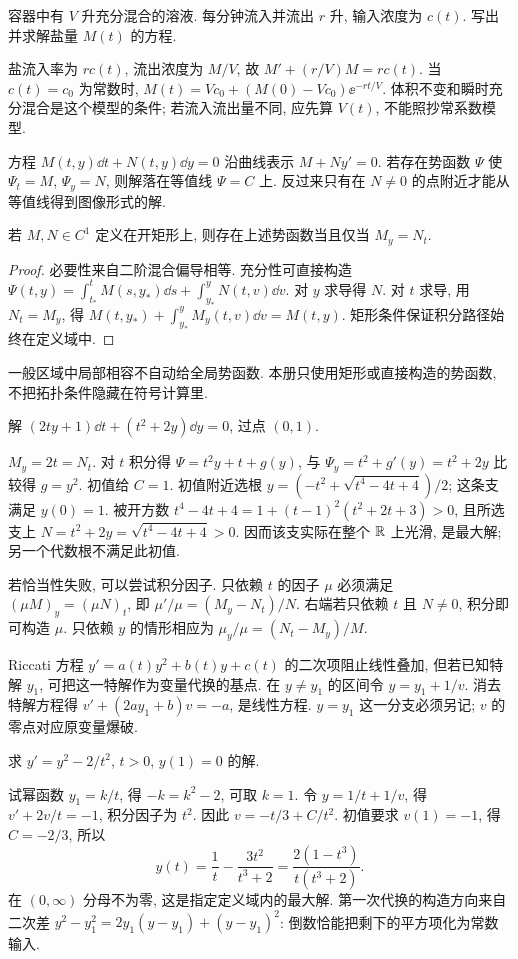 \begin{example}
容器中有 $V$ 升充分混合的溶液. 每分钟流入并流出 $r$ 升, 输入浓度为 $c(t)$. 写出并求解盐量 $M(t)$ 的方程.
\end{example}
\begin{solution}
盐流入率为 $rc(t)$, 流出浓度为 $M/V$, 故 $M'+(r/V)M=rc(t)$. 当 $c(t)=c_0$ 为常数时, $M(t)=Vc_0+(M(0)-Vc_0)\ee^{-rt/V}$. 体积不变和瞬时充分混合是这个模型的条件; 若流入流出量不同, 应先算 $V(t)$, 不能照抄常系数模型.
\end{solution}
方程 $M(t,y)\dd t+N(t,y)\dd y=0$ 沿曲线表示 $M+Ny'=0$. 若存在势函数 $\Psi$ 使 $\Psi_t=M$, $\Psi_y=N$, 则解落在等值线 $\Psi=C$ 上. 反过来只有在 $N\ne0$ 的点附近才能从等值线得到图像形式的解.
\begin{proposition}
若 $M,N\in C^1$ 定义在开矩形上, 则存在上述势函数当且仅当 $M_y=N_t$.
\end{proposition}
\begin{proof}
必要性来自二阶混合偏导相等. 充分性可直接构造
$\Psi(t,y)=\int_{t_*}^{t}M(s,y_*)\dd s+\int_{y_*}^{y}N(t,v)\dd v$.
对 $y$ 求导得 $N$. 对 $t$ 求导, 用 $N_t=M_y$, 得 $M(t,y_*)+\int_{y_*}^{y}M_y(t,v)\dd v=M(t,y)$. 矩形条件保证积分路径始终在定义域中.
\end{proof}
一般区域中局部相容不自动给全局势函数. 本册只使用矩形或直接构造的势函数, 不把拓扑条件隐藏在符号计算里.
\begin{example}解 $(2ty+1)\dd t+(t^2+2y)\dd y=0$, 过点 $(0,1)$.\end{example}
\begin{solution}
$M_y=2t=N_t$. 对 $t$ 积分得 $\Psi=t^2y+t+g(y)$, 与 $\Psi_y=t^2+g'(y)=t^2+2y$ 比较得 $g=y^2$. 初值给 $C=1$. 初值附近选根
$y=(-t^2+\sqrt{t^4-4t+4})/2$; 这条支满足 $y(0)=1$. 被开方数 $t^4-4t+4=1+(t-1)^2(t^2+2t+3)>0$, 且所选支上 $N=t^2+2y=\sqrt{t^4-4t+4}>0$. 因而该支实际在整个 $\mathbb R$ 上光滑, 是最大解; 另一个代数根不满足此初值.
\end{solution}
若恰当性失败, 可以尝试积分因子. 只依赖 $t$ 的因子 $\mu$ 必须满足 $(\mu M)_y=(\mu N)_t$, 即 $\mu'/\mu=(M_y-N_t)/N$. 右端若只依赖 $t$ 且 $N\ne0$, 积分即可构造 $\mu$. 只依赖 $y$ 的情形相应为 $\mu_y/\mu=(N_t-M_y)/M$.

Riccati 方程 $y'=a(t)y^2+b(t)y+c(t)$ 的二次项阻止线性叠加, 但若已知特解 $y_1$, 可把这一特解作为变量代换的基点. 在 $y\ne y_1$ 的区间令 $y=y_1+1/v$. 消去特解方程得 $v'+(2ay_1+b)v=-a$, 是线性方程. $y=y_1$ 这一分支必须另记; $v$ 的零点对应原变量爆破.
\begin{example}求 $y'=y^2-2/t^2$, $t>0$, $y(1)=0$ 的解.\end{example}
\begin{solution}
试幂函数 $y_1=k/t$, 得 $-k=k^2-2$, 可取 $k=1$. 令 $y=1/t+1/v$, 得 $v'+2v/t=-1$, 积分因子为 $t^2$. 因此 $v=-t/3+C/t^2$. 初值要求 $v(1)=-1$, 得 $C=-2/3$, 所以
\[
y(t)=\frac1t-\frac{3t^2}{t^3+2}=\frac{2(1-t^3)}{t(t^3+2)}.
\]
在 $(0,\infty)$ 分母不为零, 这是指定定义域内的最大解. 第一次代换的构造方向来自二次差 $y^2-y_1^2=2y_1(y-y_1)+(y-y_1)^2$: 倒数恰能把剩下的平方项化为常数输入.
\end{solution}

